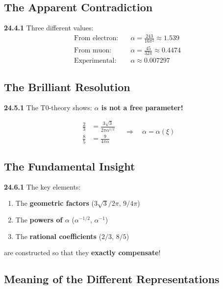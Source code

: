 \subsection{The Apparent Contradiction}

\noindent \textbf{24.4.1} Three different values:
\begin{align*}
	\text{From electron:} &\quad \alpha = \frac{243}{16\pi^2} \approx 1.539 \\
	\text{From muon:} &\quad \alpha = \frac{45}{32\pi} \approx 0.4474 \\
	\text{Experimental:} &\quad \alpha \approx 0.007297
\end{align*}

\subsection{The Brilliant Resolution}

\noindent \textbf{24.5.1} The T0-theory shows: \textbf{$\alpha$ is not a free parameter!}

\[
\boxed{
	\begin{aligned}
		\frac{2}{3} &= \frac{3\sqrt{3}}{2\pi\alpha^{1/2}} \\
		\frac{8}{5} &= \frac{9}{4\pi\alpha}
	\end{aligned}
	\quad \Rightarrow \quad
	\alpha = \alpha(\xi)
}
\]

\subsection{The Fundamental Insight}

\noindent \textbf{24.6.1} The key elements:
\begin{enumerate}
	\item The \textbf{geometric factors} ($3\sqrt{3}/2\pi$, $9/4\pi$)
	\item The \textbf{powers of $\alpha$} ($\alpha^{-1/2}$, $\alpha^{-1}$)  
	\item The \textbf{rational coefficients} ($2/3$, $8/5$)
\end{enumerate}

\noindent are constructed so that they \textbf{exactly compensate}!

\subsection{Meaning of the Different Representations}

